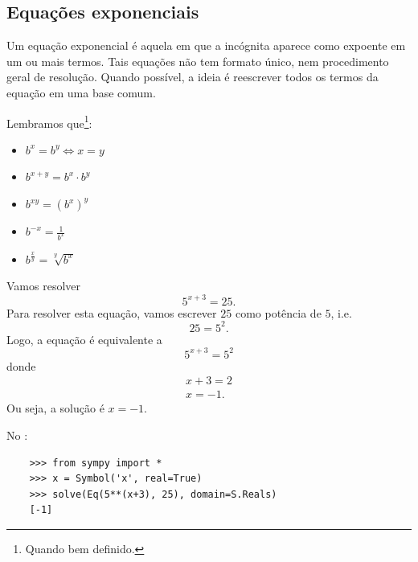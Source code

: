 \subsection{Equações exponenciais}

Um equação exponencial é aquela em que a incógnita aparece como expoente em um ou mais termos. Tais equações não tem formato único, nem procedimento geral de resolução. Quando possível, a ideia é reescrever todos os termos da equação em uma base comum.

\begin{obs}
  Lembramos que\footnote{Quando bem definido.}:
  \begin{itemize}
  \item $\displaystyle b^x = b^y \Leftrightarrow x=y$
  \item $\displaystyle b^{x+y} = b^x\cdot b^y$
  \item $\displaystyle b^{xy} = \left(b^x\right)^y$
  \item $\displaystyle b^{-x} = \frac{1}{b^x}$
  \item $\displaystyle b^{\frac{x}{y}} = \sqrt[y]{b^x}$
  \end{itemize}
\end{obs}

\begin{ex}
  Vamos resolver
  \begin{equation}
    5^{x+3} = 25.
  \end{equation}
  Para resolver esta equação, vamos escrever $25$ como potência de $5$, i.e.
  \begin{equation}
    25 = 5^2.
  \end{equation}
  Logo, a equação é equivalente a
  \begin{equation}
    5^{x+3} = 5^2
  \end{equation}
  donde
  \begin{gather}
    x+3 = 2 \\
    x = -1.
  \end{gather}
  Ou seja, a solução é $x=-1$.

  \ifispython
  No \python:
  \begin{lstlisting}
    >>> from sympy import *
    >>> x = Symbol('x', real=True)
    >>> solve(Eq(5**(x+3), 25), domain=S.Reals)
    [-1]
  \end{lstlisting}
  \fi
\end{ex}

